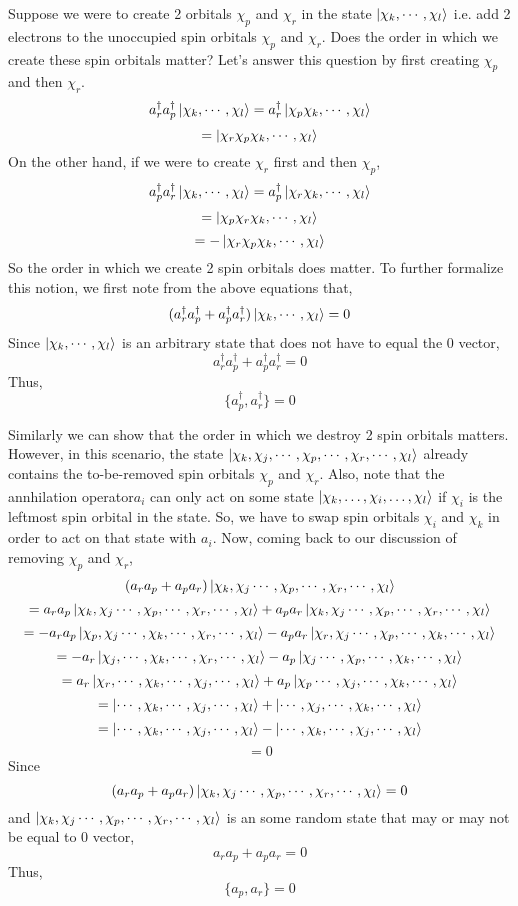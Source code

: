 \documentclass{article}
\newcommand{\adag}{a^\dagger}
\begin{document}
    Suppose we were to create 2 orbitals \(\chi_p\) and \(\chi_r\) in the
    state \(\ket{\chi_k, \cdots, \chi_l}\) i.e. add 2 electrons to the
    unoccupied spin orbitals \(\chi_p\) and \(\chi_r\). Does the order
    in which we create these spin orbitals matter? Let's answer this
    question by first creating \(\chi_p\) and then \(\chi_r\).
    \[\adag_r\adag_p\ket{\chi_k, \cdots, \chi_l} = \adag_r\ket{\chi_p\chi_k, \cdots, \chi_l}\]
    \[ = \ket{\chi_r\chi_p\chi_k, \cdots, \chi_l}\]
    On the other hand, if we were to create \(\chi_r\) first and then \(\chi_p\),
    \[\adag_p\adag_r\ket{\chi_k, \cdots, \chi_l} = \adag_p\ket{\chi_r\chi_k, \cdots, \chi_l}\]
    \[ = \ket{\chi_p\chi_r\chi_k, \cdots, \chi_l}\]
    \[ = -\ket{\chi_r\chi_p\chi_k, \cdots, \chi_l}\]
    So the order in which we create 2 spin orbitals does matter. To further
    formalize this notion, we first note from the above equations that,
    \[(\adag_r\adag_p + \adag_p\adag_r)\ket{\chi_k, \cdots, \chi_l} = 0\]
    Since \(\ket{\chi_k, \cdots, \chi_l}\) is an arbitrary state that does
    not have to equal the 0 vector,
    \[\adag_r\adag_p + \adag_p\adag_r = 0\]
    Thus,
    \[\{\adag_p, \adag_r\} = 0\]

    Similarly we can show that the order in which we destroy 2 spin orbitals
    matters. However, in this scenario, the state
    \(\ket{\chi_k, \chi_j, \cdots, \chi_p, \cdots, \chi_r, \cdots, \chi_l}\) already
    contains the to-be-removed spin orbitals \(\chi_p\) and \(\chi_r\). Also,
    note that the annhilation operator\(a_i\) can only act on some state
    \(\ket{\chi_k, \ldots, \chi_i, \ldots, \chi_l}\) if \(\chi_i\) is the
    leftmost spin orbital in the state. So, we have to swap spin orbitals
    \(\chi_i\) and \(\chi_k\) in order to act on that state with \(a_i\).
    Now, coming back to our discussion of removing \(\chi_p\) and
    \(\chi_r\),
    \[(a_{r}a_p + a_{p}a_r) \ket{\chi_k, \chi_j \cdots, \chi_p, \cdots, \chi_r, \cdots, \chi_l}\]
    \[= a_{r}a_p\ket{\chi_k, \chi_j \cdots, \chi_p, \cdots, \chi_r, \cdots, \chi_l} +
    a_{p}a_r\ket{\chi_k, \chi_j \cdots, \chi_p, \cdots, \chi_r, \cdots, \chi_l}\]
    \[= -a_{r}a_p\ket{\chi_p, \chi_j \cdots, \chi_k, \cdots, \chi_r, \cdots, \chi_l}
    - a_{p}a_r\ket{\chi_r, \chi_j \cdots, \chi_p, \cdots, \chi_k, \cdots, \chi_l} \]
    \[= -a_{r}\ket{\chi_j, \cdots, \chi_k, \cdots, \chi_r, \cdots, \chi_l}
    - a_{p}\ket{\chi_j \cdots, \chi_p, \cdots, \chi_k, \cdots, \chi_l}\]
    \[= a_{r}\ket{\chi_r, \cdots, \chi_k, \cdots, \chi_j, \cdots, \chi_l}
    + a_{p}\ket{\chi_p \cdots, \chi_j, \cdots, \chi_k, \cdots, \chi_l}\]
    \[= \ket{\cdots, \chi_k, \cdots, \chi_j, \cdots, \chi_l}
    + \ket{ \cdots, \chi_j, \cdots, \chi_k, \cdots, \chi_l}\]
    \[= \ket{\cdots, \chi_k, \cdots, \chi_j, \cdots, \chi_l}
    - \ket{ \cdots, \chi_k, \cdots, \chi_j, \cdots, \chi_l}\]
    \[= 0\]
    Since
    \[(a_{r}a_p + a_{p}a_r) \ket{\chi_k, \chi_j \cdots, \chi_p, \cdots, \chi_r, \cdots, \chi_l} =0\]
    and \(\ket{\chi_k, \chi_j \cdots, \chi_p, \cdots, \chi_r, \cdots, \chi_l}\) is an
    some random state that may or may not be equal to 0 vector,
    \[a_{r}a_p + a_{p}a_r = 0\]
    Thus,
    \[\{a_{p}, a_r\} = 0\]
\end{document}
